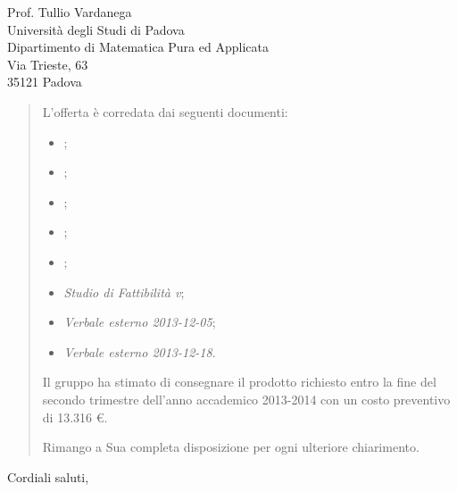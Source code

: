 \documentclass{letter}
\begin{document}
\begin{letter}{
	Prof. Tullio Vardanega \\
	Università degli Studi di Padova \\
	Dipartimento di Matematica Pura ed Applicata \\
	Via Trieste, 63 \\
	35121 Padova
}
\begin{quotation}
	L'offerta è corredata dai seguenti documenti:

	\begin{itemize}

		\item \AnalisiDeiRequisiti{};
		\item \Glossario{};
		\item \NormeDiProgetto{};
		\item \PianoDiProgetto{};
		\item \PianoDiQualifica{};
		\item \emph{Studio di Fattibilità v\VersioneSF{}};
		\item \emph{Verbale esterno 2013-12-05};
		\item \emph{Verbale esterno 2013-12-18}.

	\end{itemize}

	Il gruppo \GroupName{} ha stimato di consegnare il prodotto richiesto entro la fine del secondo trimestre dell'anno accademico 2013-2014 con un costo preventivo di 13.316 \euro.

	Rimango a Sua completa disposizione per ogni ulteriore chiarimento.

\end{quotation}

\closing{Cordiali saluti,}


\end{letter}
\end{document}
